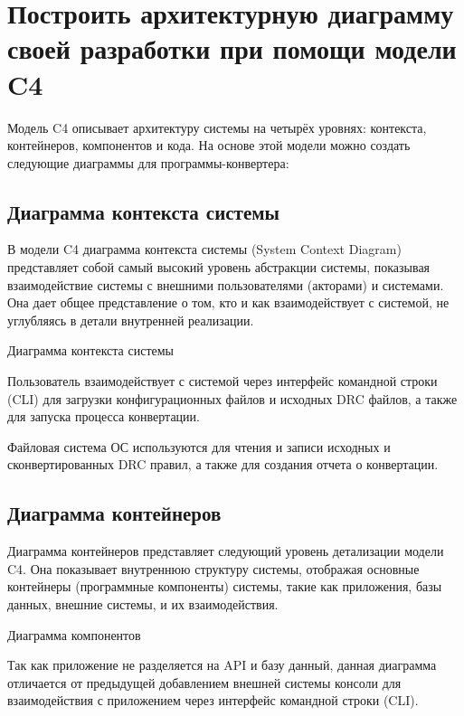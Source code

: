 \section{Построить архитектурную диаграмму своей разработки
	при помощи модели C4}

Модель C4 описывает архитектуру системы на четырёх уровнях:
контекста, контейнеров, компонентов и кода.
На основе этой модели можно создать следующие диаграммы
для программы-конвертера:

\subsection{Диаграмма контекста системы}

В модели C4 диаграмма контекста системы (System Context Diagram)
представляет собой самый высокий уровень абстракции системы,
показывая взаимодействие системы с внешними пользователями (акторами)
и системами. Она дает общее представление о том,
кто и как взаимодействует с системой,
не углубляясь в детали внутренней реализации.
   
\begin{image}
	\caption{Диаграмма контекста системы}
	\label{fig:c4:system:context}
\end{image}

Пользователь взаимодействует с системой через интерфейс командной строки (CLI)
для загрузки конфигурационных файлов и исходных DRC файлов,
а также для запуска процесса конвертации.\par
Файловая система ОС используются для чтения и записи исходных
и сконвертированных DRC правил, а также для создания отчета о конвертации.

\subsection{Диаграмма контейнеров}

Диаграмма контейнеров представляет следующий уровень детализации модели C4.
Она показывает внутреннюю структуру системы,
отображая основные контейнеры (программные компоненты) системы,
такие как приложения, базы данных, внешние системы, и их взаимодействия.
   
\begin{image}
	\caption{Диаграмма компонентов}
	\label{fig:c4:container}
\end{image}

Так как приложение не разделяется на API и базу данный,
данная диаграмма отличается от предыдущей добавлением внешней системы
консоли для взаимодействия с приложением
через интерфейс командной строки (CLI).

